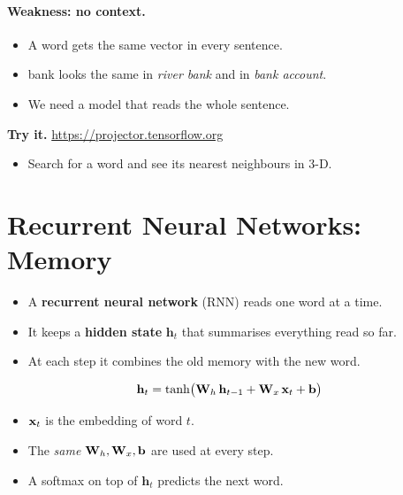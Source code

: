 \documentclass[12pt, a4paper]{article}
\providecommand{\bh}{\mathbf{h}}
\newcommand{\tok}[1]{\textsf{#1}}   %
\begin{document}
\paragraph{Weakness: no context.}
\begin{itemize}
  \item A word gets the same vector in every sentence.
  \item \tok{bank} looks the same in \emph{river bank} and in
        \emph{bank account}.
  \item We need a model that reads the whole sentence.
\end{itemize}

\begin{notebox}
  \textbf{Try it.} \url{https://projector.tensorflow.org}
  \begin{itemize}
    \item Search for a word and see its nearest neighbours in 3-D.
  \end{itemize}
\end{notebox}

\section{Recurrent Neural Networks: Memory}
\label{sec:rnn}

\begin{itemize}
  \item A \textbf{recurrent neural network} (RNN) reads one word at a time.
  \item It keeps a \textbf{hidden state} $\bh_t$ that summarises everything
        read so far.
  \item At each step it combines the old memory with the new word.
\end{itemize}

\begin{resultbox}
  \[
    \bh_t = \tanh\!\big(\bW_{h}\,\bh_{t-1} + \bW_{x}\,\bx_t + \bb\big)
  \]
  \begin{itemize}
    \item $\mathbf{x}_t$ is the embedding of word $t$.
    \item The \emph{same} $\mathbf{W}_h, \mathbf{W}_x, \mathbf{b}$ are used at every step.
    \item A softmax on top of $\bh_t$ predicts the next word.
  \end{itemize}
\end{resultbox}
\end{document}
